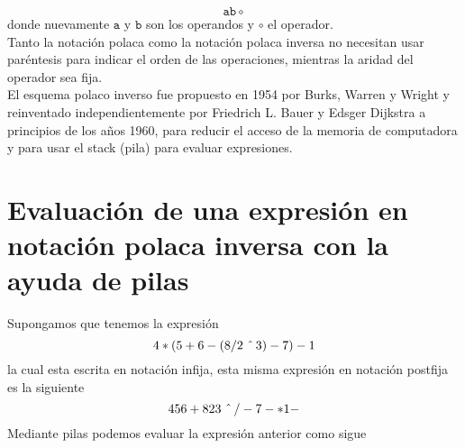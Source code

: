 \documentclass[12pt ]{article}
\begin{document}
$$  \mathtt{a} \mathtt{b}\circ$$
donde nuevamente $\mathtt{a}$ y $\mathtt{b}$ son los operandos y $\circ$ el operador.\\
 Tanto la notación polaca como la notación polaca inversa no necesitan usar paréntesis para indicar el orden de las operaciones, mientras la aridad del operador sea fija.\\
 El esquema polaco inverso fue propuesto en 1954 por Burks, Warren y Wright y reinventado independientemente por Friedrich L. Bauer y Edsger Dijkstra a principios de los años 1960, para reducir el acceso de la memoria de computadora y para usar el stack (pila) para evaluar expresiones.
 
 \section{Evaluación de una expresión en notación polaca inversa con la ayuda de pilas}
 Supongamos que tenemos la expresión  $$4*(5+6-(8/2\hspace{0.2 cm}\hat{}\hspace{0.15 cm}3)-7)-1$$ la cual esta escrita en notación infija, esta misma expresión en notación postfija es la siguiente
 $$456+823 \hspace{0.2 cm}\hat{}\hspace{0.15 cm}/-7-*1-$$
 Mediante pilas podemos evaluar la expresión anterior como sigue
\end{document}
